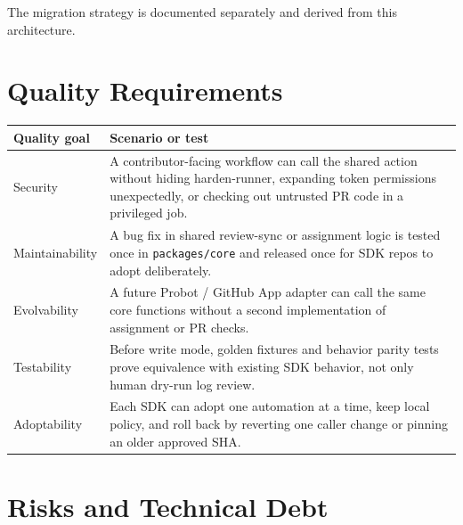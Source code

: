 \documentclass[10pt, a4paper]{article}
\begin{document}
The migration strategy is documented separately and derived from this architecture.

\section{Quality Requirements}

\begin{tabularx}{\linewidth}{@{} L{3.5cm} X @{}}
  \toprule
  \textbf{Quality goal} & \textbf{Scenario or test} \\
  \midrule
  Security
    & A contributor-facing workflow can call the shared action without hiding harden-runner,
      expanding token permissions unexpectedly, or checking out untrusted PR code in a
      privileged job. \\[6pt]
  Maintainability
    & A bug fix in shared review-sync or assignment logic is tested once in
      \texttt{packages/core} and released once for SDK repos to adopt deliberately. \\[6pt]
  Evolvability
    & A future Probot / GitHub App adapter can call the same core functions without a
      second implementation of assignment or PR checks. \\[6pt]
  Testability
    & Before write mode, golden fixtures and behavior parity tests prove equivalence with
      existing SDK behavior, not only human dry-run log review. \\[6pt]
  Adoptability
    & Each SDK can adopt one automation at a time, keep local policy, and roll back by
      reverting one caller change or pinning an older approved SHA. \\
  \bottomrule
\end{tabularx}

\section{Risks and Technical Debt}
\end{document}
